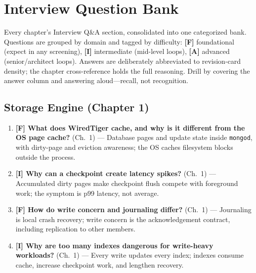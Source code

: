 \chapter{Interview Question Bank}
%
Every chapter's Interview Q\&A section, consolidated into one categorized bank. Questions are
grouped by domain and tagged by difficulty: \textbf{[F]} foundational (expect in any screening),
\textbf{[I]} intermediate (mid-level loops), \textbf{[A]} advanced (senior/architect loops).
Answers are deliberately abbreviated to revision-card density; the chapter cross-reference holds
the full reasoning. Drill by covering the answer column and answering aloud---recall, not
recognition.

\section{Storage Engine (Chapter 1)}
\begin{enumerate}
    \item \textbf{[F] What does WiredTiger cache, and why is it different from the OS page cache?} (Ch.~1) --- Database pages and update state inside \texttt{mongod}, with dirty-page and eviction awareness; the OS caches filesystem blocks outside the process.
    \item \textbf{[I] Why can a checkpoint create latency spikes?} (Ch.~1) --- Accumulated dirty pages make checkpoint flush compete with foreground work; the symptom is p99 latency, not average.
    \item \textbf{[F] How do write concern and journaling differ?} (Ch.~1) --- Journaling is local crash recovery; write concern is the acknowledgement contract, including replication to other members.
    \item \textbf{[I] Why are too many indexes dangerous for write-heavy workloads?} (Ch.~1) --- Every write updates every index; indexes consume cache, increase checkpoint work, and lengthen recovery.
\end{enumerate}

